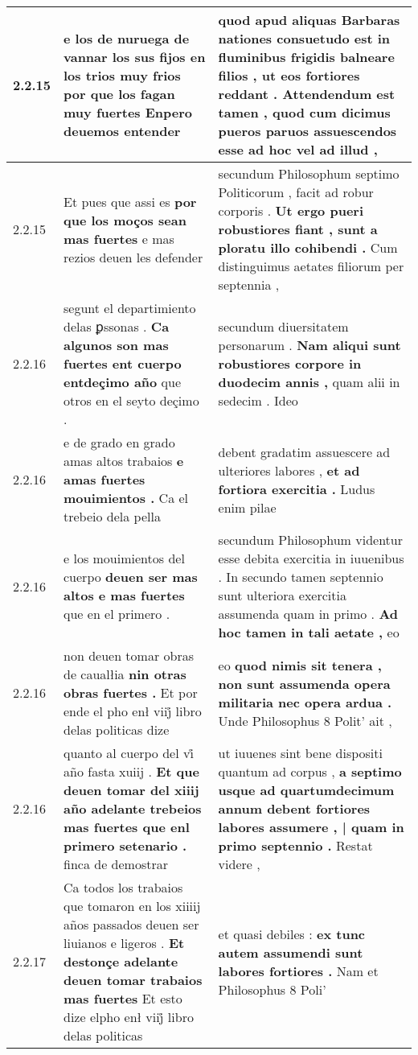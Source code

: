 \begin{tabular}{|p{1cm}|p{6.5cm}|p{6.5cm}|}
2.2.15 & e los de nuruega de vannar los sus fijos en los trios muy frios \textbf{ por que los fagan muy fuertes } Enpero deuemos entender & quod apud aliquas Barbaras nationes consuetudo est in fluminibus frigidis balneare filios , \textbf{ ut eos fortiores reddant . Attendendum est tamen , } quod cum dicimus pueros paruos assuescendos esse ad hoc vel ad illud , \\\hline
2.2.15 & Et pues que assi es \textbf{ por que los moços sean mas fuertes } e mas rezios deuen les defender & secundum Philosophum septimo Politicorum , facit ad robur corporis . \textbf{ Ut ergo pueri robustiores fiant , sunt a ploratu illo cohibendi . } Cum distinguimus aetates filiorum per septennia , \\\hline
2.2.16 & segunt el departimiento delas ꝑssonas . \textbf{ Ca algunos son mas fuertes ent cuerpo entdeçimo año } que otros en el seyto deçimo . & secundum diuersitatem personarum . \textbf{ Nam aliqui sunt robustiores corpore in duodecim annis , } quam alii in sedecim . Ideo \\\hline
2.2.16 & e de grado en grado amas altos trabaios \textbf{ e amas fuertes mouimientos . } Ca el trebeio dela pella & debent gradatim assuescere ad ulteriores labores , \textbf{ et ad fortiora exercitia . } Ludus enim pilae \\\hline
2.2.16 & e los mouimientos del cuerpo \textbf{ deuen ser mas altos e mas fuertes } que en el primero . & secundum Philosophum videntur esse debita exercitia in iuuenibus . In secundo tamen septennio sunt ulteriora exercitia assumenda quam in primo . \textbf{ Ad hoc tamen in tali aetate , } eo \\\hline
2.2.16 & non deuen tomar obras de caualłia \textbf{ nin otras obras fuertes . } Et por ende el pho enł viij̊ libro delas politicas dize & eo \textbf{ quod nimis sit tenera , non sunt assumenda opera militaria nec opera ardua . } Unde Philosophus 8 Polit’ ait , \\\hline
2.2.16 & quanto al cuerpo del vi̊ año fasta xuiij . \textbf{ Et que deuen tomar del xiiij año adelante trebeios mas fuertes que enl primero setenario . } finca de demostrar & ut iuuenes sint bene dispositi quantum ad corpus , \textbf{ a septimo usque ad quartumdecimum annum debent fortiores labores assumere , | quam in primo septennio . } Restat videre , \\\hline
2.2.17 & Ca todos los trabaios que tomaron en los xiiiij años passados deuen ser liuianos e ligeros . \textbf{ Et destonçe adelante deuen tomar trabaios mas fuertes } Et esto dize elpho enł viij̊ libro delas politicas & et quasi debiles : \textbf{ ex tunc autem assumendi sunt labores fortiores . } Nam et Philosophus 8 Poli’ \\\hline

\end{tabular}
